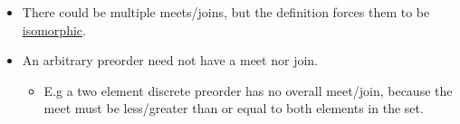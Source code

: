 \begin{itemize}
    \item There could be multiple meets/joins, but the definition forces them to be \hyperref[D1.75]{isomorphic}.
    \item An arbitrary preorder need not have a meet nor join.
          \begin{itemize}
            \item E.g a two element discrete preorder has no overall meet/join, because the meet must be less/greater than or equal to both elements in the set.
          \end{itemize}
  \end{itemize}